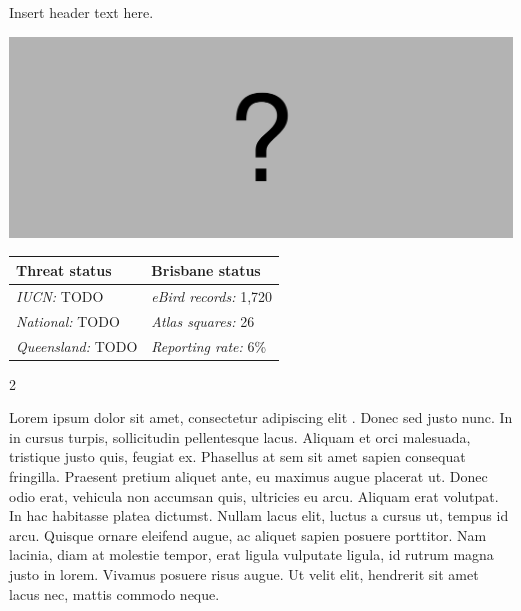 \documentclass[12pt,openany,oneside]{book}
\let\origfigure\figure
\let\endorigfigure\endfigure
\renewenvironment{figure}[1][2] {
  \expandafter\origfigure\expandafter[H]
} {
  \endorigfigure
}
\let\Begin\begin
\let\End\end
\theoremstyle{definition}
\theoremstyle{definition}
\theoremstyle{definition}
\theoremstyle{remark}
\begin{document}

Insert header text here.

\begin{figure}
\centering
\includegraphics[width=\textwidth,keepaspectratio=true]{assets/misc/missing-profile.png}
\caption{Insert caption here.}
\end{figure}

\begin{tabu} to 
\toprule
Threat status & Brisbane status\\
\midrule
\textit{IUCN:} TODO & \textit{eBird records:} 1,720\\
\textit{National:} TODO & \textit{Atlas squares:} 26\\
\textit{Queensland:} TODO & \textit{Reporting rate:} 6\%\\
\bottomrule
\end{tabu} 
\vspace{0.15cm}

\Begin{multicols}{2}

Lorem ipsum dolor sit amet, consectetur adipiscing elit
\citep{rexample1, rexample2, rexample3}. Donec sed justo nunc. In in
cursus turpis, sollicitudin pellentesque lacus. Aliquam et orci
malesuada, tristique justo quis, feugiat ex. Phasellus at sem sit amet
sapien consequat fringilla. Praesent pretium aliquet ante, eu maximus
augue placerat ut. Donec odio erat, vehicula non accumsan quis,
ultricies eu arcu. Aliquam erat volutpat. In hac habitasse platea
dictumst. Nullam lacus elit, luctus a cursus ut, tempus id arcu. Quisque
ornare eleifend augue, ac aliquet sapien posuere porttitor. Nam lacinia,
diam at molestie tempor, erat ligula vulputate ligula, id rutrum magna
justo in lorem. Vivamus posuere risus augue. Ut velit elit, hendrerit
sit amet lacus nec, mattis commodo neque.

\End{multicols}

\clearpage
\end{document}
